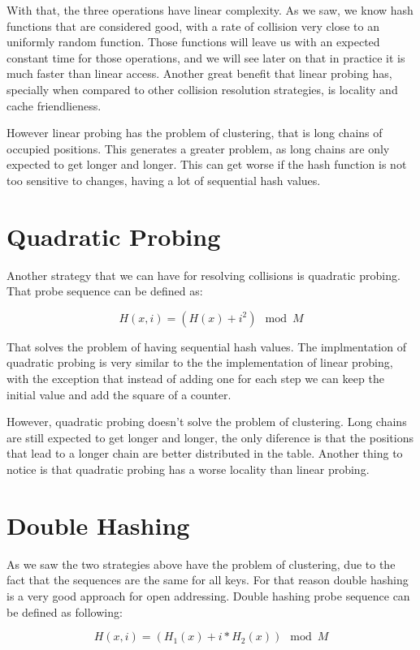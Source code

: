 With that, the three operations have linear complexity. As we saw, we know hash functions that are considered good, with a rate of collision very close to an uniformly random function. Those functions will leave us with an expected constant time for those operations, and we will see later on that in practice it is much faster than linear access. Another great benefit that linear probing has, specially when compared to other collision resolution strategies, is locality and cache friendlieness.

However linear probing has the problem of clustering, that is long chains of occupied positions. This generates a greater problem, as long chains are only expected to get longer and longer. This can get worse if the hash function is not too sensitive to changes, having a lot of sequential hash values. 

\section{Quadratic Probing}

Another strategy that we can have for resolving collisions is quadratic probing. That probe sequence can be defined as:

\[ H(x, i) = (H(x) + i^2) \mod M \]

That solves the problem of having sequential hash values. The implmentation of quadratic probing is very similar to the the implementation of linear probing, with the exception that instead of adding one for each step we can keep the initial value and add the square of a counter.

However, quadratic probing doesn't solve the problem of clustering. Long chains are still expected to get longer and longer, the only diference is that the positions that lead to a longer chain are better distributed in the table. Another thing to notice is that quadratic probing has a worse locality than linear probing. 

\section{Double Hashing}

As we saw the two strategies above have the problem of clustering, due to the fact that the sequences are the same for all keys. For that reason double hashing is a very good approach for open addressing. Double hashing probe sequence can be defined as following:

\[ H(x, i) = (H_1(x) + i * H_2(x)) \mod M \]

